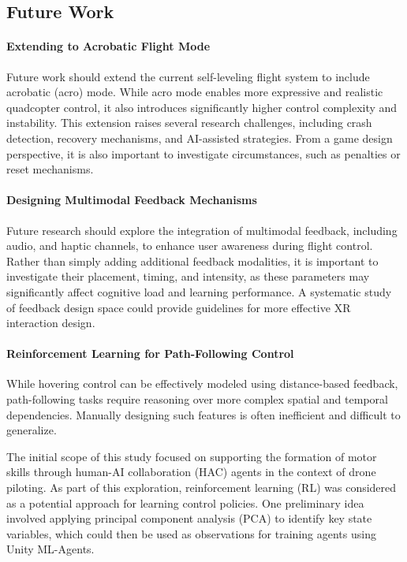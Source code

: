 \subsection*{Future Work}

\paragraph{Extending to Acrobatic Flight Mode}

Future work should extend the current self-leveling flight system to include acrobatic (acro) mode. While acro mode enables more expressive and realistic quadcopter control, it also introduces significantly higher control complexity and instability. This extension raises several research challenges, including crash detection, recovery mechanisms, and AI-assisted strategies. From a game design perspective, it is also important to investigate circumstances, such as penalties or reset mechanisms.

\paragraph{Designing Multimodal Feedback Mechanisms}

Future research should explore the integration of multimodal feedback, including audio, and haptic channels, to enhance user awareness during flight control. Rather than simply adding additional feedback modalities, it is important to investigate their placement, timing, and intensity, as these parameters may significantly affect cognitive load and learning performance. A systematic study of feedback design space could provide guidelines for more effective XR interaction design.

\paragraph{Reinforcement Learning for Path-Following Control}

While hovering control can be effectively modeled using distance-based feedback, path-following tasks require reasoning over more complex spatial and temporal dependencies. Manually designing such features is often inefficient and difficult to generalize.

The initial scope of this study focused on supporting the formation of motor skills through human-AI collaboration (HAC) agents in the context of drone piloting. As part of this exploration, reinforcement learning (RL) was considered as a potential approach for learning control policies. One preliminary idea involved applying principal component analysis (PCA) to identify key state variables, which could then be used as observations for training agents using Unity ML-Agents.

